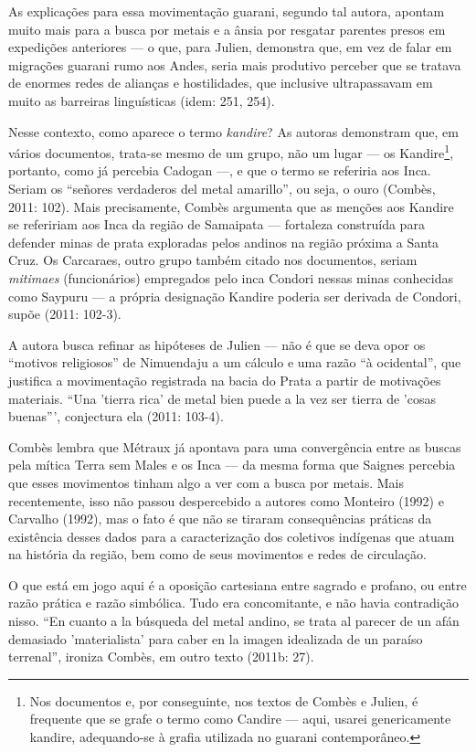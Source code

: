 As explicações para essa movimentação guarani, segundo tal autora,
apontam muito mais para a busca por metais e a ânsia por resgatar
parentes presos em expedições anteriores --- o que, para Julien,
demonstra que, em vez de falar em migrações guarani rumo aos Andes,
seria mais produtivo perceber que se tratava de enormes redes de
alianças e hostilidades, que inclusive ultrapassavam em muito as
barreiras linguísticas (idem: 251, 254).

Nesse contexto, como aparece o termo \emph{kandire}? As autoras demonstram que,
em vários documentos, trata-se mesmo de um grupo, não um lugar --- os
Kandire\footnote{Nos documentos e, por conseguinte, nos textos de
Combès e Julien, é frequente que se grafe o termo como Candire --- aqui,
usarei genericamente kandire, adequando-se à grafia utilizada no
guarani contemporâneo.}, portanto, como já percebia Cadogan ---, e que o
termo se referiria aos Inca. Seriam os ``señores verdaderos del metal
amarillo'', ou seja, o ouro (Combès, 2011: 102). Mais precisamente,
Combès argumenta que as menções aos Kandire se refeririam aos Inca da
região de Samaipata --- fortaleza construída para defender minas de prata
exploradas pelos andinos na região próxima a Santa Cruz. Os Carcaraes,
outro grupo também citado nos documentos, seriam \emph{mitimaes}
(funcionários) empregados pelo inca Condori nessas minas conhecidas
como Saypuru --- a própria designação Kandire poderia ser derivada de
Condori, supõe (2011: 102-3).

A autora busca refinar as hipóteses de Julien --- não é que se deva opor
os ``motivos religiosos'' de Nimuendaju a um cálculo e uma razão ``à
ocidental'', que justifica a movimentação registrada na bacia do Prata a
partir de motivações materiais. ``Una 'tierra
rica' de metal bien puede a la vez ser tierra de
'cosas buenas''', conjectura ela
(2011: 103-4).

Combès lembra que Métraux já apontava para uma convergência entre as
buscas pela mítica Terra sem Males e os Inca --- da mesma forma que
Saignes percebia que esses movimentos tinham algo a ver com a busca por
metais. Mais recentemente, isso não passou despercebido a autores como
Monteiro (1992) e Carvalho (1992), mas o fato é que não se tiraram
consequências práticas da existência desses dados para a caracterização
dos coletivos indígenas que atuam na história da região, bem como de
seus movimentos e redes de circulação.

O que está em jogo aqui é a oposição cartesiana entre sagrado e profano,
ou entre razão prática e razão simbólica. Tudo era concomitante, e não
havia contradição nisso. ``En cuanto a la búsqueda del metal andino, se
trata al parecer de un afán demasiado
'materialista' para caber en la
imagen idealizada de un paraíso terrenal'', ironiza Combès, em outro
texto (2011b: 27).

